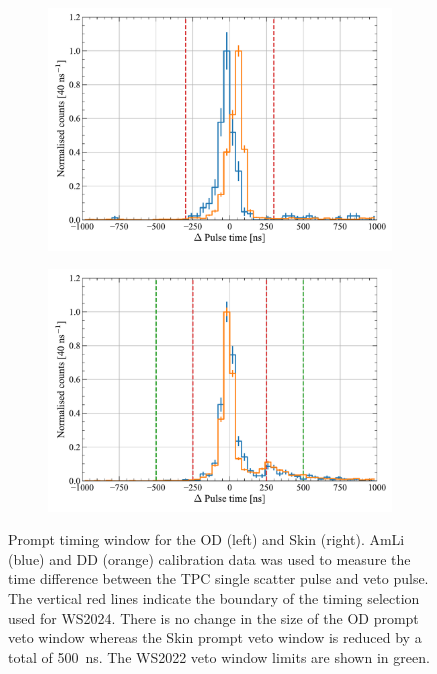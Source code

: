 \begin{figure}[!ht]
	\centering
	\begin{subfigure}[b]{0.49\textwidth}
		\centering
		\includegraphics[width=\textwidth]{figures/VetoEfficiency/ODpromptWindowTiming.pdf}
        \caption{}
		\label{fig:VetoEff/od_prompt_window}
	\end{subfigure}
	\hfill
	\begin{subfigure}[b]{0.49\textwidth}
		\centering
		\includegraphics[width=\textwidth]{figures/VetoEfficiency/SkinpromptWindowTiming.pdf}
		\caption{}
        \label{fig:VetoEff/skin_prompt_window}
	\end{subfigure}
	\caption{Prompt timing window for the OD (left) and Skin (right). %
    AmLi (blue) and DD (orange) calibration data was used to measure the time difference between the TPC single scatter pulse and veto pulse. 
    The vertical red lines indicate the boundary of the timing selection used for WS2024. There is no change in the size of the OD prompt veto window whereas the Skin prompt veto window is reduced by a total of 500~ns. The WS2022 veto window limits are shown in green.}
	\label{fig:VetoEff/veto_prompt_windows}
\end{figure}

